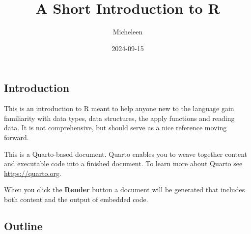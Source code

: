 \documentclass[
  letterpaper,
  DIV=11,
  numbers=noendperiod]{scrartcl}
\title{A Short Introduction to R}
\author{Micheleen}
\date{2024-09-15}
\renewcommand*\contentsname{Table of contents}
\newcommand\contentsname{Table of contents}
\begin{document}
\maketitle

\renewcommand*\contentsname{Table of contents}
{
\hypersetup{linkcolor=}
\setcounter{tocdepth}{3}
\tableofcontents
}

\subsection{Introduction}\label{introduction}

This is an introduction to R meant to help anyone new to the language
gain familiarity with data types, data structures, the apply functions
and reading data. It is not comprehensive, but should serve as a nice
reference moving forward.

This is a Quarto-based document. Quarto enables you to weave together
content and executable code into a finished document. To learn more
about Quarto see \url{https://quarto.org}.

When you click the \textbf{Render} button a document will be generated
that includes both content and the output of embedded code.

\subsection{Outline}\label{outline}
\end{document}
